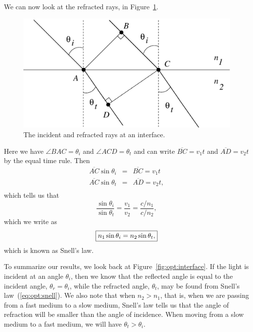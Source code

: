 We can now look at the refracted rays, in Figure~\ref{fig:opt:refracted}.
\begin{figure}[htb]
\centering 
\epsfxsize=10cm \includegraphics[scale=0.6]{8_refraction/refracted.eps}
\caption{The incident and refracted rays at an interface.}
\label{fig:opt:refracted}
\end{figure}
Here we have $\angle BAC =\theta_i$ and $\angle ACD =\theta_t$ and can write
$\overline{BC}=v_1 t$ and $\overline{AD}=v_2 t$ by the equal time rule. Then
\begin{eqnarray*}
\overline{AC}\sin\theta_i &=& \overline{BC}=v_1 t \nonumber \\
\overline{AC}\sin\theta_t &=& \overline{AD}=v_2 t, \\
\end{eqnarray*}
which tells us that
$$ \frac{\sin\theta_i}{\sin\theta_t} =\frac{v_1}{v_2} =\frac{c/n_1}{c/n_2}, $$
which we write as 
\begin{equation}
\fbox{$ \displaystyle n_1\sin\theta_i=n_2\sin\theta_t,$} \label{eq:opt:snell}
\end{equation}
which is known as Snell's law.   

To summarize our results, we look back at Figure~\ref{fig:opt:interface}.
If the light is incident at an angle $\theta_i$, then we know that the 
reflected angle is equal to the incident angle, $\theta_r=\theta_i$, while
the refracted angle, $\theta_t$, may be found from Snell's 
law~(\ref{eq:opt:snell}).  We also note that when $n_2>n_1$, that is, when we
are passing from a fast medium to a slow medium, Snell's law tells us that the 
angle of refraction will be smaller than the angle of incidence. When moving 
from a slow medium to a fast medium, we will have $\theta_t >\theta_i$.

